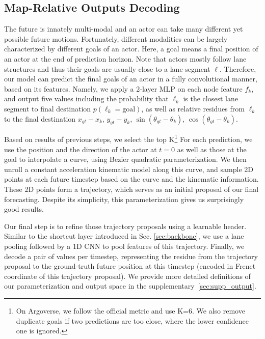 \subsection{Map-Relative Outputs Decoding}
\label{sec:output}

The future is innately multi-modal and an actor can take many different yet possible
future motions. Fortunately, different modalities can be largely characterized by
different goals of an actor. Here, a goal means a
final position of an actor at the end of prediction horizon. Note that actors
mostly follow lane structures and thus their goals are usually close to a lane
segment $\ell$. Therefore, our model can predict the final goals of an actor in a
fully convolutional manner, based on its \ROI features. Namely, we apply a
2-layer MLP on each node feature $f_k$, and output five values including the
probability that $\ell_k$ is the closest lane segment to final destination 
$p(\ell_k=\text{goal})$, as well as relative residues from $\ell_k$ to the final
destination $x_{gt} - x_{k}$, $y_{gt} - y_{k}$, $\sin(\theta_{gt} - \theta_k)$,
$\cos(\theta_{gt} - \theta_k)$.

Based on results of previous steps, we select the top K\footnote{On
Argoverse, we follow the official metric and use K=6. We also remove duplicate
goals if two predictions are too close, where the lower confidence one is
ignored.} 
For each prediction, we use the position and the direction of the actor at
$t=0$ as well as those at the goal to interpolate a curve, using Bezier
quadratic parameterization. 
We then unroll a constant acceleration kinematic model along this curve, and sample 2D
points at each future timestep based on the curve and the kinematic information.
These 2D points form a trajectory, which serves as an initial proposal of our final forecasting.
Despite its simplicity, this parameterization gives us surprisingly good results.

Our final step is to refine those trajectory proposals using a learnable header. 
Similar to the shortcut layer introduced in Sec.
\ref{sec:backbone}, we use a lane pooling followed by a 1D CNN to 
pool features of this trajectory. Finally, we decode a pair of values per timestep, representing the residue from the trajectory proposal to the
ground-truth future position at this timestep (encoded in Frenet coordinate of
this trajectory proposal). We provide more detailed definitions of our
parameterization and output space in the supplementary~\ref{sec:supp_output}.




